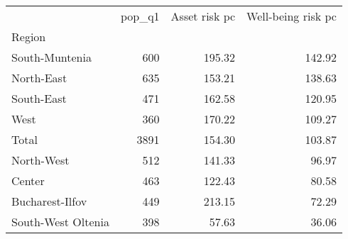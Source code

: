 \begin{tabular}{lrrr}
\toprule
{} &  pop\_q1 &  Asset risk pc &  Well-being risk pc \\
Region             &         &                &                     \\
\midrule
South-Muntenia     &     600 &         195.32 &              142.92 \\
North-East         &     635 &         153.21 &              138.63 \\
South-East         &     471 &         162.58 &              120.95 \\
West               &     360 &         170.22 &              109.27 \\
Total              &    3891 &         154.30 &              103.87 \\
North-West         &     512 &         141.33 &               96.97 \\
Center             &     463 &         122.43 &               80.58 \\
Bucharest-Ilfov    &     449 &         213.15 &               72.29 \\
South-West Oltenia &     398 &          57.63 &               36.06 \\
\bottomrule
\end{tabular}
